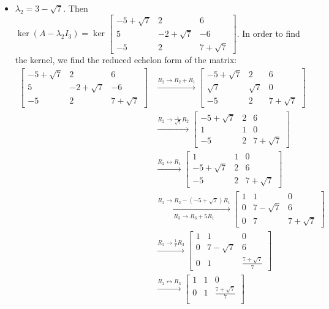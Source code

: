 \documentclass[11pt]{exam}
\begin{document}
\begin{enumerate}
\begin{itemize}
\item $\lambda_2=3-\sqrt{7}$. Then $\ker(A-\lambda_2I_3)=\ker\begin{bmatrix} -5+\sqrt{7} & 2 & 6 \\ 5 & -2+\sqrt{7} & -6 \\ -5 &2 & 7+\sqrt{7} \end{bmatrix}$. In order to find the kernel, we find the reduced echelon form of the matrix:
\begin{align*}
\begin{bmatrix} -5+\sqrt{7} & 2 & 6 \\
5 & -2+\sqrt{7} & -6 \\
-5 &2 &7+\sqrt{7} 
\end{bmatrix}
&\xrightarrow{R_2\to R_2+R_1}
\begin{bmatrix} -5+\sqrt{7} & 2 & 6 \\
\sqrt{7} & \sqrt{7} & 0 \\
-5 &2 &7+\sqrt{7}
\end{bmatrix}
\\[5pt]
&\xrightarrow{R_2\to \frac{1}{\sqrt{7}}R_2}
\begin{bmatrix} -5+\sqrt{7} & 2 & 6 \\
1 & 1 & 0 \\
-5 &2 &7+\sqrt{7}
\end{bmatrix}
\\[5pt]
&\xrightarrow{R_2 \leftrightarrow R_1}
\begin{bmatrix}
1 & 1 & 0 \\
 -5+\sqrt{7} & 2 & 6 \\
-5 &2 &7+\sqrt{7}
\end{bmatrix}
\\[5pt]
&\xrightarrow[R_3\to R_3+5R_1]{R_2 \to R_2-(-5+\sqrt{7})R_1}
\begin{bmatrix}
1 & 1 & 0 \\
0 & 7-\sqrt{7} & 6 \\
0 & 7 &7+\sqrt{7}
\end{bmatrix}
\\[5pt]
&\xrightarrow{R_3 \to \frac{1}{7}R_3}
\begin{bmatrix}
1 & 1 & 0 \\
0 & 7-\sqrt{7} & 6 \\
0 & 1 &\frac{7+\sqrt{7}}{7}
\end{bmatrix}
\\[5pt]
&\xrightarrow{R_2 \leftrightarrow R_3}
\begin{bmatrix}
1 & 1 & 0 \\
0 & 1 &\frac{7+\sqrt{7}}{7} \\

\end{bmatrix}
\end{align*}
\end{itemize}
\end{enumerate}
\end{document}

